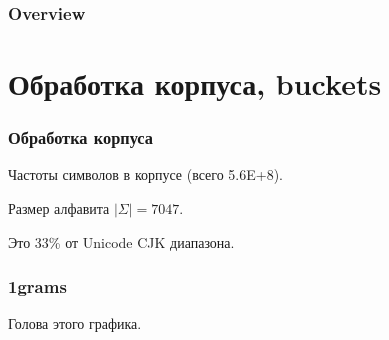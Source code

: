\documentclass[14pt]{beamer}
\begin{document}
\begin{frame}
	\frametitle{Overview}
	\tableofcontents
\end{frame}

\section{Обработка корпуса, buckets}

\begin{frame}
\frametitle{Обработка корпуса}
Частоты символов в корпусе (всего 5.6E+8).

Размер алфавита $|\Sigma| = 7047$.

Это 33\% от Unicode CJK диапазона.
\begin{figure}[h]
\end{figure}
\end{frame}

\begin{frame}
	\frametitle{1grams}
	Голова этого графика.
	\begin{figure}[h]
	\end{figure}
\end{frame}
\end{document}
